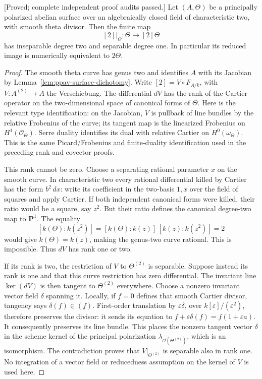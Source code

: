 \begin{lemma}
\label{lem:all-theta-double-image-candidate}
\textup{[Proved; complete independent proof audits passed.]}
Let $(A,\Theta)$ be a principally polarized abelian surface
over an algebraically closed field of characteristic two,
with smooth theta divisor. Then the finite map
\[
                         [2]|_\Theta:\Theta\longrightarrow[2]\Theta
\]
has inseparable degree two and separable degree one. In
particular its reduced image is numerically equivalent to
$2\Theta$.
\end{lemma}
\begin{proof}
The smooth theta curve has genus two and identifies $A$
with its Jacobian by Lemma~\ref{lem:ppav-surface-dichotomy}.
Write $[2]=V\circ F_{A/k}$, with
$V:A^{(2)}\to A$ the Verschiebung.
The differential $dV$ has the rank of the Cartier operator
on the two-dimensional space of canonical forms of $\Theta$.
Here is the relevant type identification: on the Jacobian,
$V$ is pullback of line bundles by the relative Frobenius
of the curve; its tangent map is the linearized Frobenius
on $H^1(\mathcal O_\Theta)$. Serre duality identifies its
dual with relative Cartier on $H^0(\omega_\Theta)$.
This is the same Picard/Frobenius and finite-duality
identification used in the preceding rank and covector
proofs.

This rank cannot be zero. Choose a separating rational
parameter $x$ on the smooth curve. In characteristic two
every rational differential killed by Cartier has the
form $b^2\,dx$: write its coefficient in the two-basis
$1,x$ over the field of squares and apply Cartier.
If both independent canonical forms were killed, their
ratio would be a square, say $z^2$. But their ratio
defines the canonical degree-two map to $\mathbf P^1$.
The equality
\[
 [k(\Theta):k(z^2)]
       =[k(\Theta):k(z)]\,[k(z):k(z^2)]=2
\]
would give $k(\Theta)=k(z)$, making the genus-two curve
rational. This is impossible. Thus $dV$ has rank one or
two.

If its rank is two, the restriction of $V$ to
$\Theta^{(2)}$ is separable. Suppose instead its rank is
one and that this curve restriction has zero differential.
The invariant line $\ker(dV)$ is then tangent to
$\Theta^{(2)}$ everywhere. Choose a nonzero invariant
vector field $\delta$ spanning it. Locally, if $f=0$
defines that smooth Cartier divisor, tangency says
$\delta(f)\in(f)$. First-order translation by
$\varepsilon\delta$, over $k[\varepsilon]/(\varepsilon^2)$,
therefore preserves the divisor: it sends its equation to
$f+\varepsilon\delta(f)=f(1+\varepsilon a)$.
It consequently preserves its line bundle. This places
the nonzero tangent vector $\delta$ in the scheme kernel
of the principal polarization
$\lambda_{\mathcal O(\Theta^{(2)})}$, which is an
isomorphism. The contradiction proves that
$V|_{\Theta^{(2)}}$ is separable also in rank one.
No integration of a vector field or reducedness assumption
on the kernel of $V$ is used here.


\end{proof}
